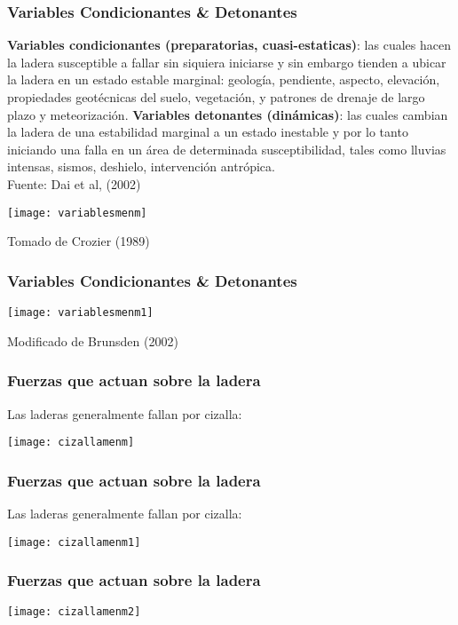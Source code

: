 \documentclass{beamer}
\begin{document}
\begin{frame}
\frametitle{Variables Condicionantes \& Detonantes}
\small{
\justifying
\textbf{Variables condicionantes (preparatorias, cuasi-estaticas)}: las cuales hacen la ladera susceptible a fallar sin siquiera iniciarse  y sin embargo tienden a ubicar la ladera en un estado estable marginal: geología, pendiente, aspecto, elevación, propiedades geotécnicas del suelo, vegetación, y patrones de drenaje de largo plazo y meteorización.
\vfill
\textbf{Variables detonantes (dinámicas)}: las cuales cambian la ladera de una estabilidad marginal a un estado inestable y por lo tanto iniciando una falla en un área de determinada susceptibilidad, tales como lluvias intensas, sismos, deshielo, intervención antrópica.\\
\tiny{Fuente: Dai et al, (2002)}
}
\begin{center}
   	\texttt{[image: variablesmenm]} 
\end{center}
\tiny{Tomado de Crozier (1989)}
\end{frame}
\begin{frame}
\frametitle{Variables Condicionantes \& Detonantes}
\begin{center}
   	\texttt{[image: variablesmenm1]} 
\end{center}
\tiny{Modificado de Brunsden (2002)}
\end{frame}
\begin{frame}
\frametitle{Fuerzas que actuan sobre la ladera}
Las laderas generalmente fallan por cizalla:
\begin{center}
   	\texttt{[image: cizallamenm]} 
\end{center}
\end{frame}
\begin{frame}
\frametitle{Fuerzas que actuan sobre la ladera}
Las laderas generalmente fallan por cizalla:
\begin{center}
   	\texttt{[image: cizallamenm1]} 
\end{center}
\end{frame}
\begin{frame}
\frametitle{Fuerzas que actuan sobre la ladera}
\begin{center}
   	\texttt{[image: cizallamenm2]} 
\end{center}
\end{frame}
\end{document}

